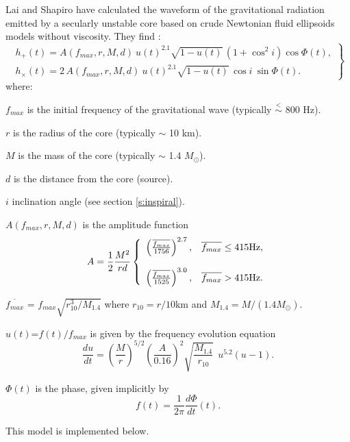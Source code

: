 Lai and Shapiro have calculated the waveform of the gravitational
radiation emitted by a secularly unstable core based on crude Newtonian fluid 
ellipsoids models without viscosity. They find \cite{LaiPC}:
\begin{equation}
   \left. \begin{array}{l}
   h_+(t) = A(f_{max},r,M,d)~u(t)^{2.1}\sqrt{1-u(t)}\,(1+\cos^2i)\cos\Phi(t),\\
   h_\times(t) = 2\, A(f_{max},r,M,d)~u(t)^{2.1}\sqrt{1-u(t)}\,\cos i~\sin \Phi(t).
   \end{array} \right\}
   \label{eq:stress}
\end{equation}
where:
\begin{description}
\item{$f_{max}$} is the initial frequency of the gravitational wave (typically
$\stackrel{<}{\sim}$ 800 Hz).
\item{$r$} is the radius of the core (typically $\sim$ 10 km).
\item{$M$} is the mass of the core (typically $\sim$ 1.4 $M_\odot$).
\item{$d$} is the distance from the core (source).
\item{$i$} inclination angle (see section \ref{s:inspiral}).
\item{$A(f_{max},r,M,d)$} is the amplitude function
\begin{equation}
   A=\frac{1}{2} \frac{M^2}{rd}\left\{\begin{array}{lr}
      \left(\frac{\overline{f_{max}}}{1756}\right)^{2.7},&
         \overline{f_{max}}\le 415 {\rm Hz},\\
			\\
      \left(\frac{\overline{f_{max}}}{1525}\right)^{3.0},&
         \overline{f_{max}} > 415 {\rm Hz}.
   \end{array} \right.
   \label{eq:amp}
\end{equation}
\item{$\overline{f_{max}}$} = $f_{max} \sqrt{r_{10}^3 / M_{1.4}}$ where $r_{10} =
r/10$km and $M_{1.4}=M/(1.4M_\odot)$.
\item{$u(t)$}=$f(t)/f_{max}$ is given by the frequency evolution equation
\begin{equation}
   \frac{du}{dt} = \left(\frac{M}{r}\right)^{5/2} \left(\frac{A}{0.16}\right)^2
   \sqrt{\frac{M_{1.4}}{r_{10}}} ~~u^{5.2} (u-1).
   \label{eq:LSfreq}
\end{equation}
\item{$\Phi(t)$} is the phase, given implicitly by
\begin{equation}
   f(t)=\frac{1}{2\pi}\frac{d\Phi}{dt}(t). \label{eq:LSphase}
\end{equation}
\end{description}
This model is implemented below.
\newpage

